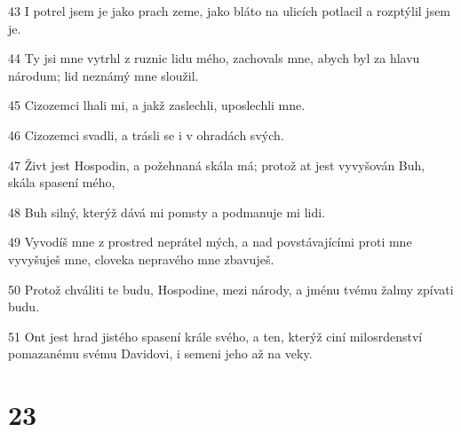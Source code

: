\par 43 I potrel jsem je jako prach zeme, jako bláto na ulicích potlacil a rozptýlil jsem je.
\par 44 Ty jsi mne vytrhl z ruznic lidu mého, zachovals mne, abych byl za hlavu národum; lid neznámý mne sloužil.
\par 45 Cizozemci lhali mi, a jakž zaslechli, uposlechli mne.
\par 46 Cizozemci svadli, a trásli se i v ohradách svých.
\par 47 Živt jest Hospodin, a požehnaná skála má; protož at jest vyvyšován Buh, skála spasení mého,
\par 48 Buh silný, kterýž dává mi pomsty a podmanuje mi lidi.
\par 49 Vyvodíš mne z prostred neprátel mých, a nad povstávajícími proti mne vyvyšuješ mne, cloveka nepravého mne zbavuješ.
\par 50 Protož chváliti te budu, Hospodine, mezi národy, a jménu tvému žalmy zpívati budu.
\par 51 Ont jest hrad jistého spasení krále svého, a ten, kterýž ciní milosrdenství pomazanému svému Davidovi, i semeni jeho až na veky.

\chapter{23}

